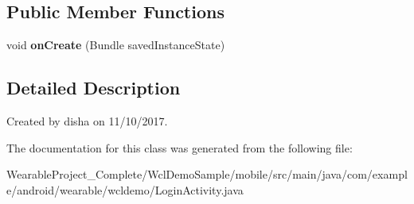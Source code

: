 \subsection*{Public Member Functions}
\begin{DoxyCompactItemize}
\item 
void {\bfseries on\+Create} (Bundle saved\+Instance\+State)\hypertarget{classcom_1_1example_1_1android_1_1wearable_1_1wcldemo_1_1LoginActivity_aafe9ff9417111e9a2af9b523616e7c16}{}\label{classcom_1_1example_1_1android_1_1wearable_1_1wcldemo_1_1LoginActivity_aafe9ff9417111e9a2af9b523616e7c16}

\end{DoxyCompactItemize}


\subsection{Detailed Description}
Created by disha on 11/10/2017. 

The documentation for this class was generated from the following file\+:\begin{DoxyCompactItemize}
\item 
Wearable\+Project\+\_\+\+Complete/\+Wcl\+Demo\+Sample/mobile/src/main/java/com/example/android/wearable/wcldemo/Login\+Activity.\+java\end{DoxyCompactItemize}
